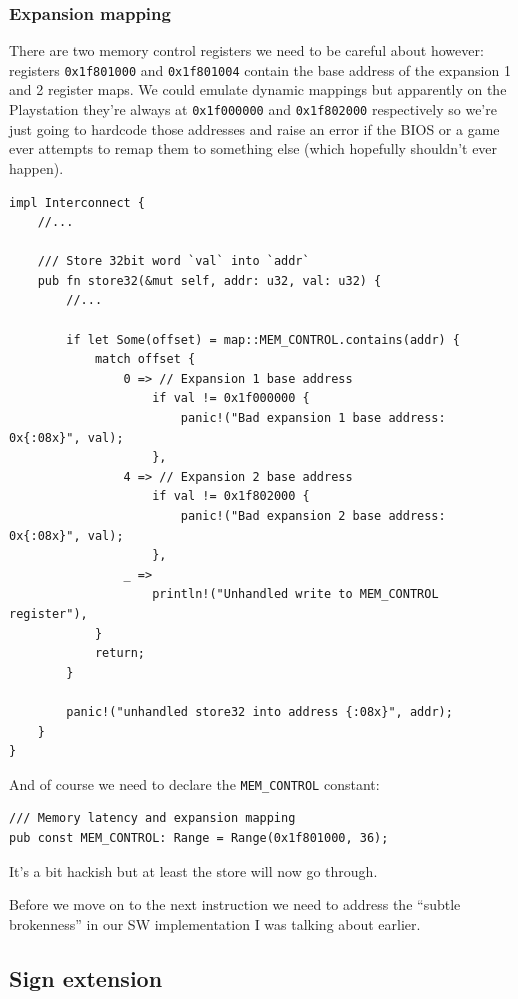 \documentclass[a4paper]{article}
\newcommand{\code}[1] {\texttt{#1}}
\begin{document}
\subsubsection{Expansion mapping}

There are two memory control registers we need to be careful about
however: registers \code{0x1f801000} and \code{0x1f801004} contain
the base address of the expansion 1 and 2 register maps. We could
emulate dynamic mappings but apparently on the Playstation they're
always at \code{0x1f000000} and \code{0x1f802000} respectively so
we're just going to hardcode those addresses and raise an error if the
BIOS or a game ever attempts to remap them to something else (which
hopefully shouldn't ever happen).

\begin{lstlisting}
impl Interconnect {
    //...

    /// Store 32bit word `val` into `addr`
    pub fn store32(&mut self, addr: u32, val: u32) {
        //...

        if let Some(offset) = map::MEM_CONTROL.contains(addr) {
            match offset {
                0 => // Expansion 1 base address
                    if val != 0x1f000000 {
                        panic!("Bad expansion 1 base address: 0x{:08x}", val);
                    },
                4 => // Expansion 2 base address
                    if val != 0x1f802000 {
                        panic!("Bad expansion 2 base address: 0x{:08x}", val);
                    },
                _ =>
                    println!("Unhandled write to MEM_CONTROL register"),
            }
            return;
        }

        panic!("unhandled store32 into address {:08x}", addr);
    }
}
\end{lstlisting}

And of course we need to declare the \code{MEM\_CONTROL} constant:

\begin{lstlisting}
/// Memory latency and expansion mapping
pub const MEM_CONTROL: Range = Range(0x1f801000, 36);
\end{lstlisting}

It's a bit hackish but at least the store will now go through.

Before we move on to the next instruction we need to address the
``subtle brokenness'' in our SW implementation I was talking about
earlier.

\subsection{Sign extension}
\end{document}
